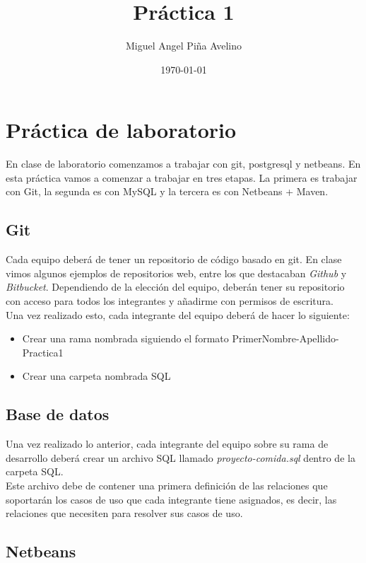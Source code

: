 \documentclass[11pt]{article}
\author{Miguel Angel Piña Avelino}
\date{\today}
\title{Práctica 1}
\begin{document}
\maketitle

\section*{Práctica de laboratorio}

En clase de laboratorio comenzamos a trabajar con git, postgresql y
netbeans. En esta práctica vamos a comenzar a trabajar en tres
etapas. La primera es trabajar con Git, la segunda es con MySQL y la
tercera es con Netbeans + Maven.

\subsection*{Git}
Cada equipo deberá de tener un repositorio de código basado en git. En
clase vimos algunos ejemplos de repositorios web, entre los que
destacaban \textit{Github} y \textit{Bitbucket}. Dependiendo de la
elección del equipo, deberán tener su repositorio con acceso  para
todos los integrantes y añadirme con permisos de escritura.\\

Una vez realizado esto, cada integrante del equipo deberá de hacer lo siguiente:
\begin{itemize}
  \item Crear una rama nombrada siguiendo el formato
    {PrimerNombre}-{Apellido}-{Practica1}
  \item Crear una carpeta nombrada SQL
\end{itemize}

\subsection*{Base de datos}

Una vez realizado lo anterior, cada integrante del equipo sobre su
rama de desarrollo deberá crear un archivo SQL llamado
\textit{proyecto-comida.sql} dentro de la carpeta SQL.\\

Este archivo debe de contener una primera definición de las relaciones
que soportarán los casos de uso que cada integrante tiene asignados,
es decir, las relaciones que necesiten para resolver sus casos de
uso.\\

\subsection*{Netbeans}
\end{document}
